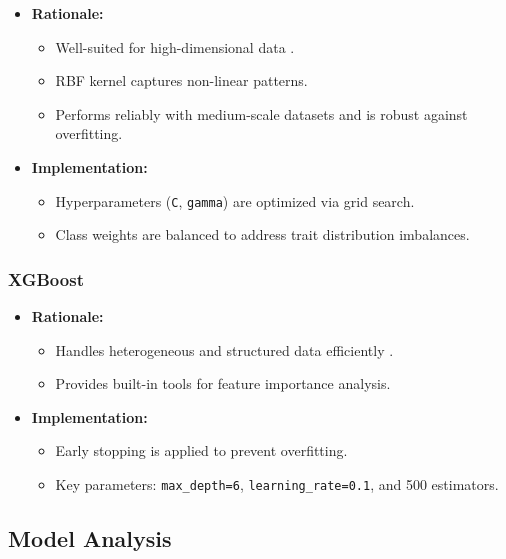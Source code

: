 \begin{itemize}
	\item \textbf{Rationale:}
	\begin{itemize}
		\item Well-suited for high-dimensional data \cite{farnadi2018}.
		\item RBF kernel captures non-linear patterns.
		\item Performs reliably with medium-scale datasets and is robust against overfitting.
	\end{itemize}
	
	\item \textbf{Implementation:}
	\begin{itemize}
		\item Hyperparameters (\texttt{C}, \texttt{gamma}) are optimized via grid search.
		\item Class weights are balanced to address trait distribution imbalances.
	\end{itemize}
\end{itemize}

\subsubsection{XGBoost}
\label{subsubsec:xgboost}

\begin{itemize}
	\item \textbf{Rationale:}
	\begin{itemize}
		\item Handles heterogeneous and structured data efficiently \cite{chen2016}.
		\item Provides built-in tools for feature importance analysis.
	\end{itemize}
	
	\item \textbf{Implementation:}
	\begin{itemize}
		\item Early stopping is applied to prevent overfitting.
		\item Key parameters: \texttt{max\_depth=6}, \texttt{learning\_rate=0.1}, and 500 estimators.
	\end{itemize}
\end{itemize}

\subsection{Model Analysis}
\label{subsec:analysis}

